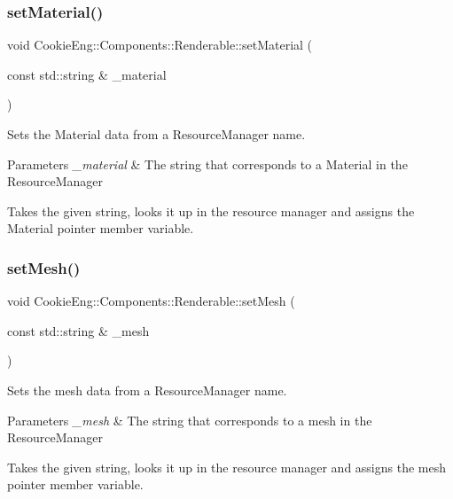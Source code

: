 \subsubsection{\texorpdfstring{set\+Material()}{setMaterial()}}
{\footnotesize\ttfamily void Cookie\+Eng\+::\+Components\+::\+Renderable\+::set\+Material (\begin{DoxyParamCaption}\item[{const std\+::string \&}]{\+\_\+material }\end{DoxyParamCaption})}



Sets the Material data from a Resource\+Manager name. 


\begin{DoxyParams}{Parameters}
{\em \+\_\+material} & The string that corresponds to a Material in the Resource\+Manager\\
\hline
\end{DoxyParams}
Takes the given string, looks it up in the resource manager and assigns the Material pointer member variable. \mbox{\label{class_cookie_eng_1_1_components_1_1_renderable_a4b9903e0bfb81ec574d022d7b2c198af}} 
\subsubsection{\texorpdfstring{set\+Mesh()}{setMesh()}}
{\footnotesize\ttfamily void Cookie\+Eng\+::\+Components\+::\+Renderable\+::set\+Mesh (\begin{DoxyParamCaption}\item[{const std\+::string \&}]{\+\_\+mesh }\end{DoxyParamCaption})}



Sets the mesh data from a Resource\+Manager name. 


\begin{DoxyParams}{Parameters}
{\em \+\_\+mesh} & The string that corresponds to a mesh in the Resource\+Manager\\
\hline
\end{DoxyParams}
Takes the given string, looks it up in the resource manager and assigns the mesh pointer member variable. 

